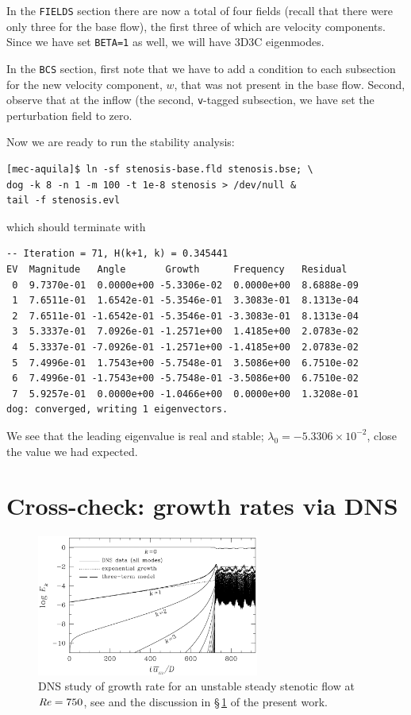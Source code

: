 \documentclass[11pt,a4paper]{report}
\newcommand\Rey{\mbox{\textit{Re}}}
\begin{document}
In the \verb+FIELDS+ section there are now a total of four fields
(recall that there were only three for the base flow), the first three
of which are velocity components.  Since we have set \verb+BETA=1+ as
well, we will have 3D3C eigenmodes.

In the \verb+BCS+ section, first note that we have to add a condition
to each subsection for the new velocity component, $w$, that was not
present in the base flow. Second, observe that at the inflow (the
second, \verb+v+-tagged subsection, we have set the perturbation field
to zero.

Now we are ready to run the stability analysis:
\begin{verbatim}
[mec-aquila]$ ln -sf stenosis-base.fld stenosis.bse; \
dog -k 8 -n 1 -m 100 -t 1e-8 stenosis > /dev/null &
tail -f stenosis.evl
\end{verbatim}
which should terminate with
{\small
\begin{verbatim}
-- Iteration = 71, H(k+1, k) = 0.345441
EV  Magnitude   Angle       Growth      Frequency   Residual
 0  9.7370e-01  0.0000e+00 -5.3306e-02  0.0000e+00  8.6888e-09
 1  7.6511e-01  1.6542e-01 -5.3546e-01  3.3083e-01  8.1313e-04
 2  7.6511e-01 -1.6542e-01 -5.3546e-01 -3.3083e-01  8.1313e-04
 3  5.3337e-01  7.0926e-01 -1.2571e+00  1.4185e+00  2.0783e-02
 4  5.3337e-01 -7.0926e-01 -1.2571e+00 -1.4185e+00  2.0783e-02
 5  7.4996e-01  1.7543e+00 -5.7548e-01  3.5086e+00  6.7510e-02
 6  7.4996e-01 -1.7543e+00 -5.7548e-01 -3.5086e+00  6.7510e-02
 7  5.9257e-01  0.0000e+00 -1.0466e+00  0.0000e+00  1.3208e-01
dog: converged, writing 1 eigenvectors.
\end{verbatim}
}\noindent We see that the leading eigenvalue is real and stable;
$\lambda_0=-5.3306\times10^{-2}$, close the value we had expected.


\section{Cross-check: growth rates via DNS}
\label{sec.check}

\begin{figure}
\begin{center}
\includegraphics[width=0.65\textwidth]{StenGrow}
\end{center}
\caption{DNS study of growth rate for an unstable steady stenotic flow
  at $\Rey=750$, see \citet{shbl05} and the discussion in
  \S\,\ref{sec.check} of the present work.  }
\label{fig.stengrow}
\end{figure}
\end{document}
